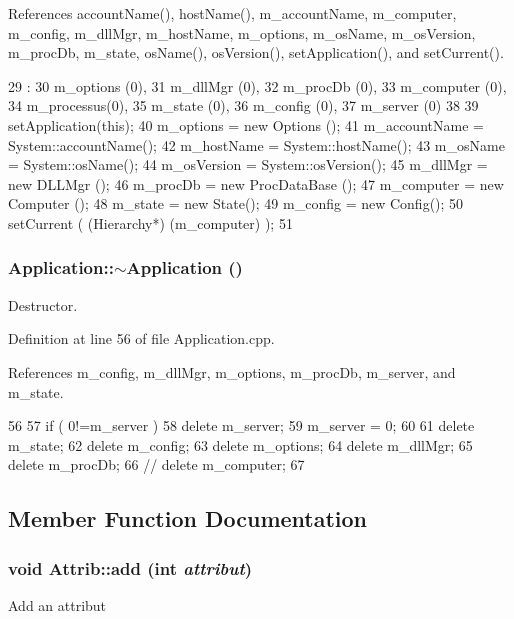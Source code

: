 References accountName(), hostName(), m\_\-accountName, m\_\-computer, m\_\-config, m\_\-dllMgr, m\_\-hostName, m\_\-options, m\_\-osName, m\_\-osVersion, m\_\-procDb, m\_\-state, osName(), osVersion(), setApplication(), and setCurrent().


\begin{DoxyCode}
29                            :
30   m_options  (0),
31   m_dllMgr   (0),
32   m_procDb   (0),
33   m_computer (0),
34   m_processus(0),
35   m_state    (0),
36   m_config   (0),
37   m_server   (0)
38 {
39   setApplication(this);
40   m_options     = new Options  ();
41   m_accountName = System::accountName();
42   m_hostName    = System::hostName();
43   m_osName      = System::osName();
44   m_osVersion   = System::osVersion();
45   m_dllMgr      = new DLLMgr   ();
46   m_procDb      = new ProcDataBase ();
47   m_computer    = new Computer ();
48   m_state       = new State();
49   m_config      = new Config();
50   setCurrent ( (Hierarchy*) (m_computer) );
51 }
\end{DoxyCode}
\hypertarget{classApplication_a748bca84fefb9c12661cfaa2f623748d}{
\subsubsection[{$\sim$Application}]{\setlength{\rightskip}{0pt plus 5cm}Application::$\sim$Application ()}}
\label{classApplication_a748bca84fefb9c12661cfaa2f623748d}


Destructor. 

Definition at line 56 of file Application.cpp.

References m\_\-config, m\_\-dllMgr, m\_\-options, m\_\-procDb, m\_\-server, and m\_\-state.


\begin{DoxyCode}
56                           {
57   if (  0!=m_server ) {
58     delete m_server;
59     m_server = 0;
60   }
61   delete m_state;
62   delete m_config;
63   delete m_options;
64   delete m_dllMgr;
65   delete m_procDb;
66   //  delete m_computer;
67 }
\end{DoxyCode}


\subsection{Member Function Documentation}
\hypertarget{classAttrib_a235f773af19c900264a190b00a3b4ad7}{
\subsubsection[{add}]{\setlength{\rightskip}{0pt plus 5cm}void Attrib::add (int {\em attribut})}}
\label{classAttrib_a235f773af19c900264a190b00a3b4ad7}
Add an attribut 


